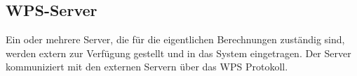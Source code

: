         \subsection{WPS-Server}
        
        Ein oder mehrere Server, die für die eigentlichen Berechnungen zuständig sind, werden extern zur Verfügung gestellt und in das System eingetragen. Der Server kommuniziert mit den externen Servern über das WPS Protokoll.
    